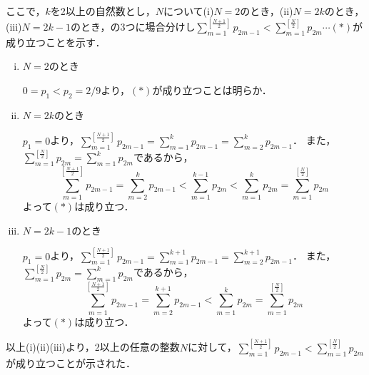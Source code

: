 \documentclass[../main]{subfiles}
\begin{document}
\begin{enumerate}[(1)]
			ここで，$k$を2以上の自然数とし，$N$について(i)$N=2$のとき，(ii)$N=2k$のとき，(iii)$N=2k-1$のとき，の3つに場合分けし$\displaystyle \sum_{m=1}^{[\frac{N+1}{2}]}p_{2m-1}<\sum_{m=1}^{[\frac{N}{2}]}p_{2m}\cdots (\ast)$が成り立つことを示す．
			\begin{enumerate}[(i)]
				\item $N=2$のとき
							
							$0=p_1<p_2=2/9$より，$(\ast)$が成り立つことは明らか．
				\item $N=2k$のとき
				
							$p_1=0$より，$\displaystyle \sum_{m=1}^{[\frac{N+1}{2}]}p_{2m-1}=\sum_{m=1}^kp_{2m-1}=\sum_{m=2}^kp_{2m-1}$．
							また，$\sum_{m=1}^{[\frac{N}{2}]}p_{2m}=\sum_{m=1}^kp_{2m}$であるから，
							\[
								\sum_{m=1}^{[\frac{N+1}{2}]}p_{2m-1}
								=\sum_{m=2}^kp_{2m-1}
								<\sum_{m=1}^{k-1}p_{2m}
								<\sum_{m=1}^kp_{2m}
								=\sum_{m=1}^{[\frac{N}{2}]}p_{2m}
							\]
							よって$(\ast)$は成り立つ．
				\item $N=2k-1$のとき
							
							$p_1=0$より，$\displaystyle \sum_{m=1}^{[\frac{N+1}{2}]}p_{2m-1}=\sum_{m=1}^{k+1}p_{2m-1}=\sum_{m=2}^{k+1}p_{2m-1}$．
							また，$\sum_{m=1}^{[\frac{N}{2}]}p_{2m}=\sum_{m=1}^kp_{2m}$であるから，
							\[
								\sum_{m=1}^{[\frac{N+1}{2}]}p_{2m-1}
								=\sum_{m=2}^{k+1}p_{2m-1}
								<\sum_{m=1}^kp_{2m}
								=\sum_{m=1}^{[\frac{N}{2}]}p_{2m}
							\]
							よって$(\ast)$は成り立つ．
			\end{enumerate}
			以上(i)(ii)(iii)より，2以上の任意の整数$N$に対して，$\displaystyle \sum_{m=1}^{[\frac{N+1}{2}]}p_{2m-1}<\sum_{m=1}^{[\frac{N}{2}]}p_{2m}$が成り立つことが示された．
			
\end{enumerate}
\end{document}
